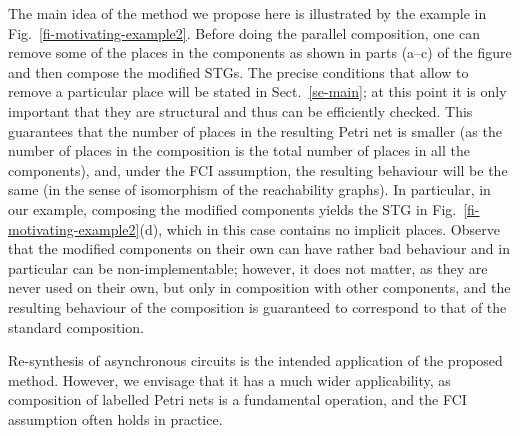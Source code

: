 The main idea of the method we propose here is illustrated by the example in Fig.~\ref{fi-motivating-example2}. Before doing the parallel composition, one can remove some of the places in the components as shown in parts (a--c) of the figure and then compose the modified STGs. The precise conditions that allow to remove a particular place will be stated in Sect.~\ref{se-main}; at this point it is only important that they are structural and thus can be efficiently checked. This guarantees that the number of places in the resulting Petri net is smaller (as the number of places in the composition is the total number of places in all the components), and, under the FCI assumption, the resulting behaviour will be the same (in the sense of isomorphism of the reachability graphs). In particular, in our example, composing the modified components yields the STG in Fig.~\ref{fi-motivating-example2}(d), which in this case contains no implicit places. Observe that the modified components on their own can have rather bad behaviour and in particular can be non-implementable; however, it does not matter, as they are never used on their own, but only in composition with other components, and the resulting behaviour of the composition is guaranteed to correspond to that of the standard composition.

Re-synthesis of asynchronous circuits is the intended application of the proposed method. However, we envisage that it has a much wider applicability, as composition of labelled Petri nets is a fundamental operation, and the FCI assumption often holds in practice.
